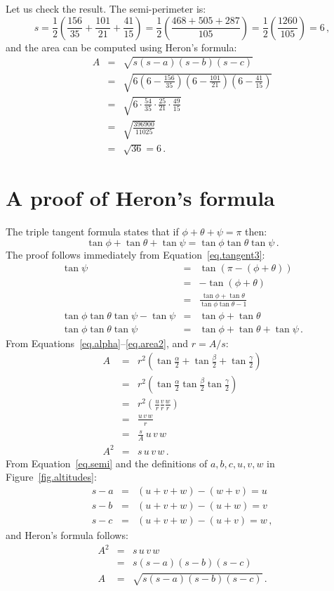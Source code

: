 \documentclass[11pt,a4paper]{article}
\begin{document}
Let us check the result. The semi-perimeter is:
\[
s=\frac{1}{2}\left(\frac{156}{35} + \frac{101}{21}+\frac{41}{15}\right) = \frac{1}{2}\left(\frac{468+505+287}{105}\right) = \frac{1}{2}\left(\frac{1260}{105}\right)= 6\,,
\]
and the area can be computed using Heron's formula:
\begin{eqnarray*}
A &=& \sqrt{s(s-a)(s-b)(s-c)}\\
&=& \sqrt{6 \left(6-\frac{156}{35}\right) \left(6-\frac{101}{21}\right) \left(6-\frac{41}{15}\right)}\\
&=& \sqrt{6 \cdot \frac{54}{35}\cdot \frac{25}{21} \cdot \frac{49}{15}}\\
&=& \sqrt{\frac{396900}{11025}}\\
&=& \sqrt{36} = 6\,.
\end{eqnarray*}

\section{A proof of Heron's formula}

The triple tangent formula states that if $\phi+\theta+\psi=\pi$ then:
\begin{equation}
\tan\phi+\tan\theta+\tan\psi = \tan\phi\tan\theta\tan\psi\,. \label{eq.triple}
\end{equation}
The proof follows immediately from Equation~\ref{eq.tangent3}:
\begin{eqnarray*}
\tan\psi &=& \tan (\pi-(\phi+\theta))\\
&=& -\tan (\phi+\theta)\\
&=& \frac{\tan\phi+\tan\theta}{\tan\phi\tan\theta-1}\\
\tan\phi\tan\theta\tan\psi-\tan\psi&=& \tan\phi+\tan\theta\\
\tan\phi\tan\theta\tan\psi &=&\tan\phi+\tan\theta+\tan\psi\,.
\end{eqnarray*}
From Equations~\ref{eq.alpha}--\ref{eq.area2}, and $r=A/s$:
\begin{eqnarray*}
A &=& r^2\left(\tan \frac{\alpha}{2}+\tan \frac{\beta}{2}+\tan \frac{\gamma}{2}\right)\\
&=&r^2\left(\tan \frac{\alpha}{2}\tan \frac{\beta}{2}\tan \frac{\gamma}{2}\right)\\
&=&r^2\left(\frac{u}{r}\frac{v}{r}\frac{w}{r}\right)\\
&=&\frac{u\,v\,w}{r}\\
&=&\frac{s}{A}\,u\,v\,w\\
A^2&=&s\,u\,v\,w\,.
\end{eqnarray*}
From Equation~\ref{eq.semi} and the definitions of $a,b,c,u,v,w$ in Figure~\ref{fig.altitudes}:
\begin{eqnarray*}
s - a &=& (u+v+w) - (w+v) = u\\
s - b &=& (u+v+w) - (u+w) = v\\
s - c &=& (u+v+w) - (u+v) = w\,,
\end{eqnarray*}
and Heron's formula follows:
\begin{eqnarray*}
A^2 &=& s\,u\,v\,w\\
&=& s(s-a)(s-b)(s-c)\\
A &=& \sqrt{s(s-a)(s-b)(s-c)}\,.
\end{eqnarray*}
\end{document}
